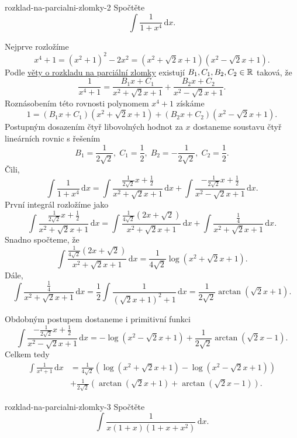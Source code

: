 \begin{problem}{}{rozklad-na-parcialni-zlomky-2}
 Spočtěte
 \[
  \int \frac{1}{1 + x^{4}} \, \mathrm{d}x.
 \]
\end{problem}
\begin{probsol}
 Nejprve rozložíme
 \[
  x^{4} + 1 = (x^2 + 1)^2 - 2x^2 = (x^2 + \sqrt{2}x + 1)(x^2 - \sqrt{2}x + 1).
 \]
 Podle \hyperref[thm:rozklad-na-parcialni-zlomky]{věty o rozkladu na parciální
 zlomky} existují $B_1,C_1,B_2,C_2 \in \mathbb{R}$ taková, že
 \[
  \frac{1}{x^{4} + 1} = \frac{B_1x + C_1}{x^2 + \sqrt{2}x + 1} + \frac{B_2x +
  C_2}{x^2 - \sqrt{2}x + 1}.
 \]
 Roznásobením této rovnosti polynomem $x^{4} + 1$ získáme
 \[
  1 = (B_1x + C_1)(x^2 + \sqrt{2}x + 1) + (B_2x + C_2)(x^2 - \sqrt{2}x + 1).
 \]
 Postupným dosazením čtyř libovolných hodnot za $x$ dostaneme soustavu čtyř
 lineárních rovnic s řešením
 \[
  B_1 = \frac{1}{2 \sqrt{2}}, \; C_1 = \frac{1}{2}, \; B_2 = -\frac{1}{2
  \sqrt{2}}, \; C_2 = \frac{1}{2}.
 \]
 Čili,
 \[
  \int \frac{1}{1+x^{4}} \, \mathrm{d}x = \int \frac{\frac{1}{2 \sqrt{2}}x +
  \frac{1}{2}}{x^2 + \sqrt{2}x + 1} \, \mathrm{d}x + \int \frac{-\frac{1}{2
  \sqrt{2}}x + \frac{1}{2}}{x^2 - \sqrt{2}x + 1} \, \mathrm{d}x.
 \]
 První integrál rozložíme jako
 \[
  \int \frac{\frac{1}{2 \sqrt{2}}x + \frac{1}{2}}{x^2 + \sqrt{2}x + 1} \,
  \mathrm{d}x = \int \frac{\frac{1}{4 \sqrt{2}}(2x + \sqrt{2})}{x^2 + \sqrt{2}x
  + 1} \, \mathrm{d}x + \int \frac{\frac{1}{4}}{x^2 + \sqrt{2}x + 1} \,
  \mathrm{d}x.
 \]
 Snadno spočteme, že
 \[
  \int \frac{\frac{1}{4 \sqrt{2}}(2x + \sqrt{2})}{x^2 + \sqrt{2}x + 1} \,
  \mathrm{d}x = \frac{1}{4 \sqrt{2}}\log(x^2 + \sqrt{2}x + 1).
 \]
 Dále,
 \[
  \int \frac{\frac{1}{4}}{x^2 + \sqrt{2}x + 1} \, \mathrm{d}x = \frac{1}{2}\int
  \frac{1}{(\sqrt{2}x + 1)^2 + 1}\, \mathrm{d}x = \frac{1}{2
  \sqrt{2}}\arctan(\sqrt{2}x + 1).
 \]

 Obdobným postupem dostaneme i primitivní funkci
 \[
  \int \frac{-\frac{1}{2 \sqrt{2}}x + \frac{1}{2}}{x^2 - \sqrt{2}x + 1} \,
  \mathrm{d}x = -\log(x^2 - \sqrt{2}x + 1) + \frac{1}{2
  \sqrt{2}}\arctan(\sqrt{2}x - 1).
 \]
 Celkem tedy
 \begin{align*}
  \int \frac{1}{x^{4} + 1} \, \mathrm{d}x &= \frac{1}{4 \sqrt{2}}(\log(x^2 +
  \sqrt{2}x + 1) - \log(x^2 - \sqrt{2}x + 1))\\
  &+ \frac{1}{2 \sqrt{2}}(\arctan(\sqrt{2}x + 1) + \arctan(\sqrt{2}x - 1)).
 \end{align*}
\end{probsol}

\begin{exercise}{}{rozklad-na-parcialni-zlomky-3}
 Spočtěte
 \[
  \int \frac{1}{x(1+x)(1 + x + x^2)} \, \mathrm{d}x. 
 \]
\end{exercise}
